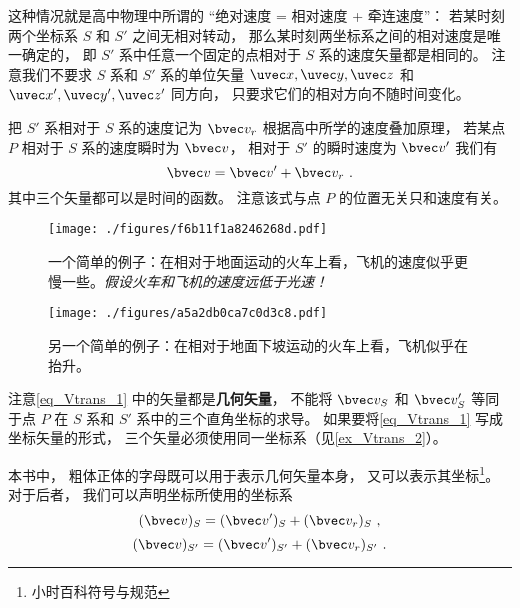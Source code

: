 

这种情况就是高中物理中所谓的 “绝对速度 = 相对速度 + 牵连速度”： 若某时刻两个坐标系 $S$ 和 $S'$ 之间无相对转动， 那么某时刻两坐标系之间的相对速度是唯一确定的， 即 $S'$ 系中任意一个固定的点相对于 $S$ 系的速度矢量都是相同的。 注意我们不要求 $S$ 系和 $S'$ 系的单位矢量 $\uvec x, \uvec y, \uvec z$ 和 $\uvec x', \uvec y', \uvec z'$ 同方向， 只要求它们的相对方向不随时间变化。

把 $S'$ 系相对于 $S$ 系的速度记为 $\bvec v_r$ 根据高中所学的速度叠加原理， 若某点 $P$ 相对于 $S$ 系的速度瞬时为 $\bvec v$， 相对于 $S'$ 的瞬时速度为 $\bvec v'$ 我们有
\begin{equation}\label{eq_Vtrans_1}
\bvec v = \bvec v' + \bvec v_r~.
\end{equation}
其中三个矢量都可以是时间的函数。 注意该式与点 $P$ 的位置无关只和速度有关。

\begin{figure}[ht]
\centering
\texttt{[image: ./figures/f6b11f1a8246268d.pdf]}
\caption{一个简单的例子：在相对于地面运动的火车上看，飞机的速度似乎更慢一些。\textsl{假设火车和飞机的速度远低于光速！}} \label{fig_Vtrans_1}
\end{figure}

\begin{figure}[ht]
\centering
\texttt{[image: ./figures/a5a2db0ca7c0d3c8.pdf]}
\caption{另一个简单的例子：在相对于地面下坡运动的火车上看，飞机似乎在抬升。} \label{fig_Vtrans_2}
\end{figure}

注意\autoref{eq_Vtrans_1} 中的矢量都是\textbf{几何矢量}， 不能将 $\bvec v_S$ 和 $\bvec v_S'$ 等同于点 $P$ 在 $S$ 系和 $S'$ 系中的三个直角坐标的求导。 如果要将\autoref{eq_Vtrans_1} 写成坐标矢量的形式， 三个矢量必须使用同一坐标系（见\autoref{ex_Vtrans_2}）。

本书中， 粗体正体的字母既可以用于表示几何矢量本身， 又可以表示其坐标\footnote{小时百科符号与规范}。 对于后者， 我们可以声明坐标所使用的坐标系
\begin{equation}\label{eq_Vtrans_5}
(\bvec v)_{S} = (\bvec v')_{S} + (\bvec v_r)_{S}~,
\end{equation}
\begin{equation}\label{eq_Vtrans_6}
(\bvec v)_{S'} = (\bvec v')_{S'} + (\bvec v_r)_{S'}~.
\end{equation}

